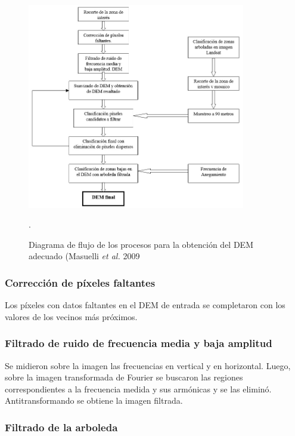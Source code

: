 \documentclass[10pt,a4paper, twoside]{report}
\begin{document}
\begin{figure}[!htb]
   \centering      
   \includegraphics[width=0.85\textwidth]{imagenes/metodologiaSergio.jpg}
 \caption{Diagrama de flujo de los procesos para la obtención del DEM adecuado (Masuelli \textit{et al.} 2009}.
 \label{metodologiaSergio}
\end{figure}

\subsubsection{Corrección de píxeles faltantes}

Los píxeles con datos faltantes en el DEM de entrada se completaron con los valores de los vecinos más próximos.

\subsubsection{Filtrado de ruido de frecuencia media y baja amplitud}

Se midieron sobre la imagen las frecuencias en vertical y en horizontal. Luego, sobre la imagen transformada de Fourier se buscaron las regiones correspondientes a la frecuencia medida y sus armónicas y se las eliminó. Antitransformando se obtiene la imagen filtrada.

\subsubsection{Filtrado de la arboleda}
\end{document}
